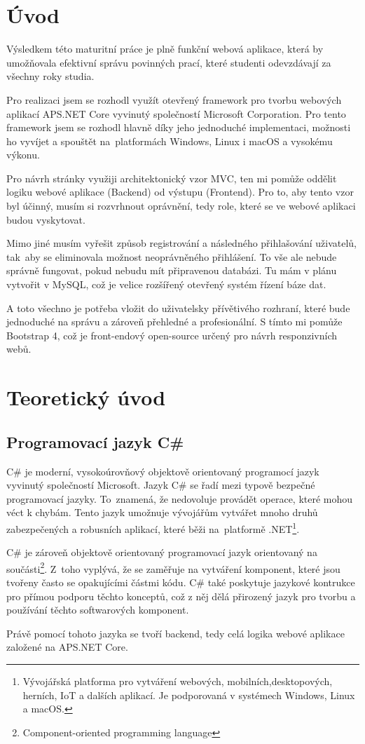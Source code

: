 \documentclass[a4paper, 12pt]{report}
\begin{document}
	\chapter{Úvod}
    Výsledkem této maturitní práce je plně funkční webová aplikace, která by umožňovala efektivní správu povinných prací, které studenti odevzdávají za všechny roky studia.\par
	Pro realizaci jsem se rozhodl využít otevřený framework pro tvorbu webových aplikací APS.NET Core vyvinutý společností Microsoft Corporation. Pro tento framework jsem se rozhodl hlavně díky jeho jednoduché implementaci, možnosti ho vyvíjet a spouštět na~platformách Windows, Linux i macOS a vysokému výkonu.\par
	Pro návrh stránky využiji architektonický vzor MVC, ten mi pomůže oddělit logiku webové aplikace (Backend) od výstupu (Frontend). Pro to, aby tento vzor byl účinný, musím si rozvrhnout oprávnění, tedy role, které se ve webové aplikaci budou vyskytovat.\par
	Mimo jiné musím vyřešit způsob registrování a následného přihlašování uživatelů, tak~aby se eliminovala možnost neoprávněného přihlášení. To vše ale nebude správně fungovat, pokud nebudu mít připravenou databázi. Tu mám v plánu vytvořit v MySQL, což je velice rozšířený otevřený systém řízení báze dat.\par
	A toto všechno je potřeba vložit do uživatelsky přívětivého rozhraní, které bude jednoduché na správu a zároveň přehledné a profesionální. S tímto mi pomůže Bootstrap 4, což je front-endový open-source určený pro návrh responzivních webů.

	\chapter{Teoretický úvod}

	\section{Programovací jazyk C\#}
	C\# je moderní, vysokoúrovňový objektově orientovaný programocí jazyk vyvinutý společností Microsoft. Jazyk C\# se řadí mezi typově bezpečné programovací jazyky. To~znamená, že nedovoluje provádět operace, které mohou véct k chybám. Tento jazyk umožnuje vývojářům vytvářet mnoho druhů zabezpečených a robusních aplikací, které běži na~platformě .NET\footnote{Vývojářská platforma pro vytváření webových, mobilních,desktopových, herních, IoT a dalších aplikací. Je podporovaná v systémech Windows, Linux a macOS.}.\par
	C\# je zároveň objektově orientovaný programovací jazyk orientovaný na součásti\footnote{Component-oriented programming language}. Z~toho vyplývá, že se zaměřuje na vytváření komponent, které jsou tvořeny často se opakujícími částmi kódu. C\# také poskytuje jazykové kontrukce pro přímou podporu těchto konceptů, což z něj dělá přirozený jazyk pro tvorbu a používání těchto softwarových komponent.\cite{CSharp}\par
		Právě pomocí tohoto jazyka se tvoří backend, tedy celá logika webové aplikace založené na APS.NET Core.
\end{document}
